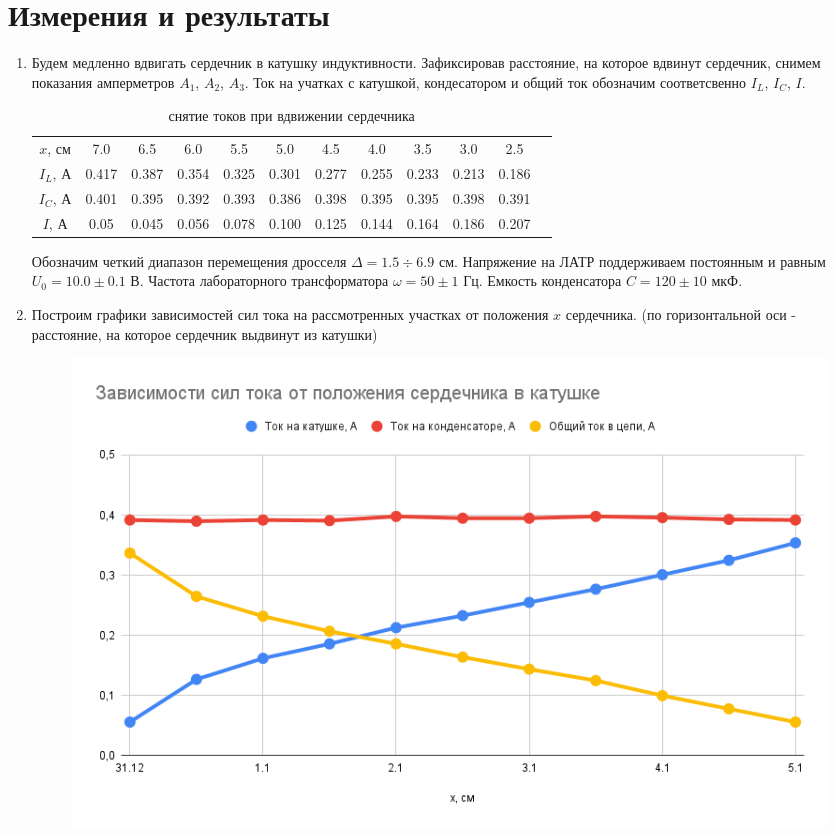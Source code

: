 \documentclass[a4paper, 12pt]{article}
\begin{document}
\section*{Измерения и результаты}
\begin{enumerate}
    \item Будем медленно вдвигать сердечник в катушку индуктивности. Зафиксировав расстояние, на которое вдвинут сердечник, снимем показания
    амперметров $A_{1}$, $A_{2}$, $A_{3}$. Ток на учатках с катушкой, кондесатором и общий ток обозначим соответсвенно $I_{L}$, $I_{C}$, $I$.
    \begin{table}[htbp]
        \centering
        \begin{tabular}{|c|c|c|c|c|c|c|c|c|c|c|c|}
            \hline
            $x$, см & 7.0 & 6.5 & 6.0 & 5.5 & 5.0 & 4.5 & 4.0 & 3.5 & 3.0 & 2.5 \\
            $I_{L}$, А & 0.417 & 0.387 & 0.354 & 0.325 & 0.301 & 0.277 & 0.255 & 0.233 & 0.213 & 0.186 \\
            $I_{C}$, А & 0.401 & 0.395 & 0.392 & 0.393 & 0.386 & 0.398 & 0.395 & 0.395 & 0.398 & 0.391 \\
            $I$, А & 0.05 & 0.045 & 0.056 & 0.078 & 0.100 & 0.125 & 0.144 & 0.164 & 0.186 & 0.207 \\
            \hline
        \end{tabular}
        \caption{снятие токов при вдвижении сердечника}
        \label{снятие токов при вдвижении сердечника}
    \end{table}\newline
    Обозначим четкий диапазон перемещения дросселя $\Delta = 1.5 \div 6.9$ см.
    Напряжение на ЛАТР поддерживаем постоянным и равным $U_{0} = 10.0 \pm 0.1$ В.
    Частота лабораторного трансформатора $\omega = 50\pm 1$ Гц.
    Емкость конденсатора $C = 120\pm 10$ мкФ.
    \newpage
    \item Построим графики зависимостей сил тока на рассмотренных участках от положения $x$ сердечника.
    (по горизонтальной оси - расстояние, на которое сердечник выдвинут из катушки)
    \begin{figure}[htbp]
        \centering
        \includegraphics[width=0.6\linewidth]{I_x.png}

\end{figure}
\end{enumerate}
\end{document}
